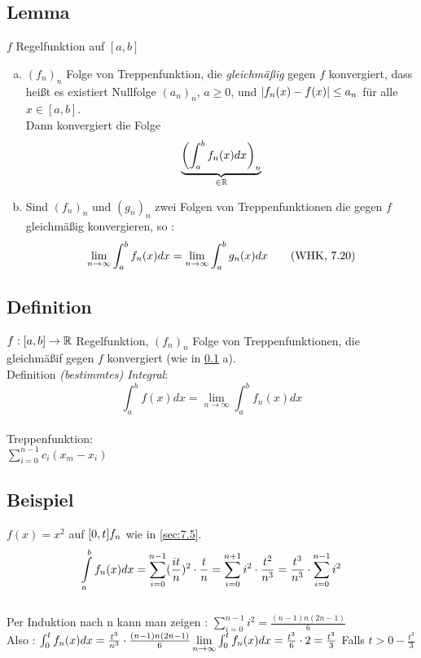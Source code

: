 \subsection{Lemma}\label{sec:7.6}
$f$ Regelfunktion auf $[a,b]$\\
\begin{enumerate}[a)]
\item $(f_n)_n$ Folge von Treppenfunktion, die \emph{gleichmä\ss ig} gegen $f$ konvergiert, dass hei\ss t es existiert Nullfolge $(a_n)_n$, $a \geq 0$, und $\lvert f_n(x)-f(x) \rvert \le a_n$ für alle $x \in [a,b]$.\\
Dann konvergiert die Folge \[\underbrace{\biggl(\int_{a}^{b}f_n(x)dx \biggr)_n}_{\in \mathbb{R}}\]
\item Sind $(f_n)_n$ und $(g_n)_n$ zwei Folgen von Treppenfunktionen die gegen $f$ gleichmä\ss ig konvergieren, so :\\
\begin{align}
\lim_{n \to \infty} \int_{a}^{b} f_n(x)dx = \lim_{n \to \infty} \int_{a}^{b} g_n(x)dx \tag{\text{WHK, 7.20}}
\end{align}
\end{enumerate}
\subsection{Definition}\label{sec:7.7}
$f : [a,b] \to \mathbb{R} $ Regelfunktion, $(f_n)_n$ Folge von Treppenfunktionen, die gleichmä\ss if gegen $f$ konvergiert (wie in \ref{sec:7.6} a).\\
Definition \emph{(bestimmtes) Integral}:
\[\int_{a}^{b} f(x) dx = \lim_{n \to \infty} \int_a^b f_n(x)dx \]\\
Treppenfunktion:\\
$\sum\limits_{i=0}^{n-1} c_i (x_m - x_i)$\\
\subsection{Beispiel}\label{sec:7.8}
$f(x) = x^2$ auf $[0,t]\\
f_n$ wie in \ref{sec:7.5}.\\
\[\int\limits_{a}^b f_n(x)dx = \sum\limits_{i=0}^{n-1}(\frac{it}{n})^2 \cdot \frac{t}{n} =\sum\limits_{i=0}^{n+1} i^2 \cdot \frac{t^2}{n^3} = \frac{t^3}{n^3}\cdot \sum\limits_{i=0}^{n-1} i^2\]\\
Per Induktion nach n kann man zeigen : $\sum\limits_{i=0}^{n-1} i^2 = \frac{(n-1)n(2n-1)}{6}$\\
Also : $\int_{0}^{t} f_n(x)dx = \frac{t^3}{n^3} \cdot \frac{(n-1)n(2n-1)}{6}\\
\lim\limits_{n \to \infty} \int_{0}^{t} f_n(x)dx = \frac{t^3}{6} \cdot 2 = \frac{t^3}{3}$
Falls $ t > 0 -\frac{t^3}{3}$

